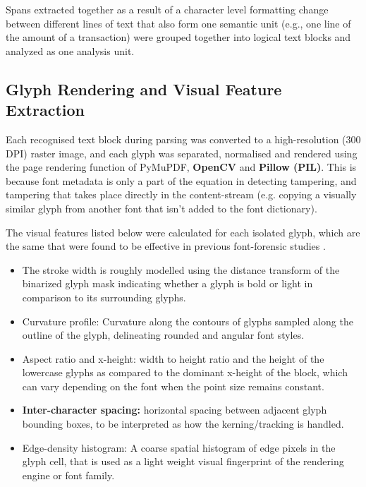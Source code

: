 \noindent Spans extracted together as a result of a character level formatting change between different lines of text that also form one semantic unit (e.g., one line of the amount of a transaction) were grouped together into logical text blocks and analyzed as one analysis unit.

\subsection{Glyph Rendering and Visual Feature Extraction}

Each recognised text block during parsing was converted to a high-resolution (300 DPI) raster image, and each glyph was separated, normalised and rendered using the page rendering function of PyMuPDF, \textbf{OpenCV} and \textbf{Pillow (PIL)}. This is because font metadata is only a part of the equation in detecting tampering, and tampering that takes place directly in the content-stream (e.g. copying a visually similar glyph from another font that isn't added to the font dictionary).

\noindent The visual features listed below were calculated for each isolated glyph, which are the same that were found to be effective in previous font-forensic studies \cite{Chen2022FontForgery,Chernyshova2018Font}.

\begin{itemize}
    \item The stroke width is roughly modelled using the distance transform of the binarized glyph mask indicating whether a glyph is bold or light in comparison to its surrounding glyphs.
    \item Curvature profile: Curvature along the contours of glyphs sampled along the outline of the glyph, delineating rounded and angular font styles.
    \item Aspect ratio and x-height: width to height ratio and the height of the lowercase glyphs as compared to the dominant x-height of the block, which can vary depending on the font when the point size remains constant.
    \item \textbf{Inter-character spacing:} horizontal spacing between adjacent glyph bounding boxes, to be interpreted as how the kerning/tracking is handled.
    \item Edge-density histogram: A coarse spatial histogram of edge pixels in the glyph cell, that is used as a light weight visual fingerprint of the rendering engine or font family.
\end{itemize}

